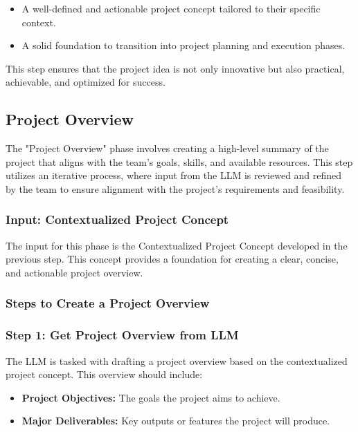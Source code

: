 \documentclass[14pt, a4paper]{article}
\begin{document}
\begin{itemize}
    \item A well-defined and actionable project concept tailored to their
    specific context.
    \item A solid foundation to transition into project planning and execution
    phases.
\end{itemize}

This step ensures that the project idea is not only innovative but also
practical, achievable, and optimized for success.

\subsection{Project Overview}

The "Project Overview" phase involves creating a high-level summary of the
project that aligns with the team's goals, skills, and available resources. This
step utilizes an iterative process, where input from the LLM is reviewed and
refined by the team to ensure alignment with the project’s requirements and
feasibility.

\subsubsection{Input: Contextualized Project Concept}

The input for this phase is the Contextualized Project Concept developed in the
previous step. This concept provides a foundation for creating a clear, concise,
and actionable project overview.

\subsubsection{Steps to Create a Project Overview}

\subsubsection*{Step 1: Get Project Overview from LLM}

The LLM is tasked with drafting a project overview based on the contextualized
project concept. This overview should include:

\begin{itemize}
    \item \textbf{Project Objectives:} The goals the project aims to achieve.
    \item \textbf{Major Deliverables:} Key outputs or features the project will
    produce. 
\end{itemize}
\end{document}
